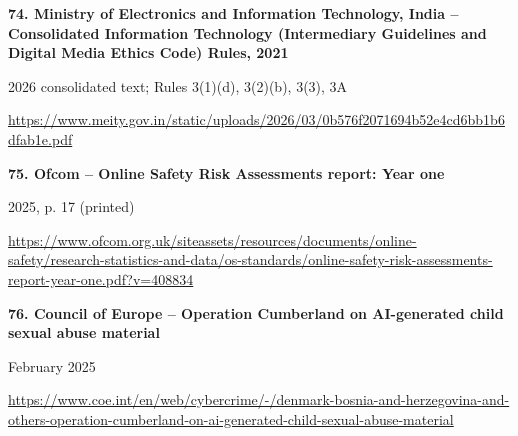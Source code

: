 \documentclass[11pt,a4paper]{article}
\begin{document}
\noindent\begin{minipage}{\linewidth}\textbf{74. Ministry of Electronics and Information Technology, India -- Consolidated Information Technology (Intermediary Guidelines and Digital Media Ethics Code) Rules, 2021}\par{\small 2026 consolidated text; Rules 3(1)(d), 3(2)(b), 3(3), 3A\par\url{https://www.meity.gov.in/static/uploads/2026/03/0b576f2071694b52e4cd6bb1b6dfab1e.pdf}}\par\end{minipage}\par\vspace{2mm}
\noindent\begin{minipage}{\linewidth}\textbf{75. Ofcom -- Online Safety Risk Assessments report: Year one}\par{\small 2025, p. 17 (printed)\par\url{https://www.ofcom.org.uk/siteassets/resources/documents/online-safety/research-statistics-and-data/os-standards/online-safety-risk-assessments-report-year-one.pdf?v=408834}}\par\end{minipage}\par\vspace{2mm}
\noindent\begin{minipage}{\linewidth}\textbf{76. Council of Europe -- Operation Cumberland on AI-generated child sexual abuse material}\par{\small February 2025\par\url{https://www.coe.int/en/web/cybercrime/-/denmark-bosnia-and-herzegovina-and-others-operation-cumberland-on-ai-generated-child-sexual-abuse-material}}\par\end{minipage}\par\vspace{2mm}
\end{document}
